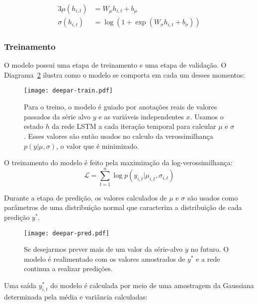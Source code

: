 \begin{alignat}{3}
  \mu(h_{i,t}) &= W_{\mu}h_{i,t} + b_{\mu} \\ 
  \sigma(h_{i,t}) &= \log(1 + \exp(W_{\sigma}h_{i,t}+ b_{\sigma}))
\end{alignat}


\subsubsection{Treinamento}


O modelo possui uma etapa de treinamento e uma etapa de validação. O Diagrama~\ref{fig:deepartrain} ilustra como o modelo se comporta em cada um desses momentos: \\


\begin{figure}[H]
  \centering
  \texttt{[image: deepar-train.pdf]}
  \caption{Para o treino, o modelo é guiado por anotações reais de valores
    passados da série alvo $y$ e as variáveis independentes $x$. Usamos o estado
  $h$ da rede LSTM a cada iteração temporal para calcular $\mu$  e $\sigma$.
  Esses valores são então usados no calculo da verossimilhança $p(y |
  \mu,\sigma)$, o valor que é minimizado.}
  \label{fig:deepartrain}
\end{figure}


O treinamento do modelo é feito pela maximização da log-verossimilhança: \\

\begin{equation}
  \mathcal{L} = \sum^n_{t=1}{\log p(y_{i,t} | \mu_{i,t},\sigma_{i,t})}
  \end{equation}

Durante a etapa de predição, os valores calculados de $\mu$ e $\sigma$ são
usados como parâmetros de uma distribuição normal que caracteriza a distribuição
de cada predição $y^*$.


\begin{figure}[H]
  \centering
  \texttt{[image: deepar-pred.pdf]}
  \caption{Se desejarmos prever mais de um valor da série-alvo $y$ no futuro. O
    modelo é realimentado com os valores amostrados de $y^*$ e a rede continua a
  realizar predições.}
  \label{fig:deepartrain}
\end{figure}


Uma saída $y^*_{i,t}$ do modelo é calculada por meio de uma amostragem da Gaussiana determinada pela média e variância calculadas: \\

